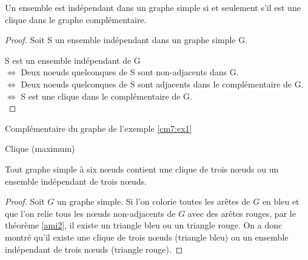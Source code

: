 \begin{mytheo}
  Un ensemble est indépendant dans un graphe simple si et seulement s'il est une clique dans le graphe complémentaire.
  \begin{proof}
     Soit S un ensemble indépendant dans un graphe simple G.
     
     S est un ensemble indépendant de G \\
     $\Leftrightarrow$ Deux noeuds quelconques de S sont non-adjacents dans G. \\
     $\Leftrightarrow$ Deux noeuds quelconques de S sont adjacents dans le complémentaire de G. \\
     $\Leftrightarrow$ S est une clique dans le complémentaire de G.\\
  \end{proof}
\end{mytheo}


\begin{myexem} Complémentaire du graphe de l'exemple \ref{cm7:ex1}
	\begin{figure} [!h]
    \end{figure} \newline
    \color{red}Clique (maximum) \color{black}
\end{myexem}

\begin{mytheo} 
  Tout graphe simple à six nœuds contient une clique de trois nœuds ou un ensemble indépendant de trois nœuds.
  \begin{proof}
     Soit $G$ un graphe simple. Si l'on colorie toutes les arêtes de $G$ en bleu et que l'on relie tous les nœuds non-adjacents de $G$ avec des arêtes rouges, par le théorème \ref{ami2}, il existe un triangle bleu ou un triangle rouge. On a donc montré qu'il existe une clique de trois nœuds (triangle bleu) ou un ensemble indépendant de trois nœuds (triangle rouge).
  \end{proof}
\end{mytheo}


